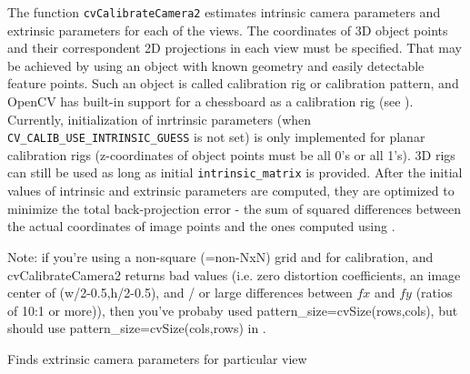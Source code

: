 The function \texttt{cvCalibrateCamera2} estimates intrinsic camera
parameters and extrinsic parameters for each of the views. The
coordinates of 3D object points and their correspondent 2D projections
in each view must be specified. That may be achieved by using an
object with known geometry and easily detectable feature points.
Such an object is called calibration rig or calibration pattern,
and OpenCV has built-in support for a chessboard as a calibration
rig (see ). Currently, initialization
of inrtrinsic parameters (when \texttt{CV\_CALIB\_USE\_INTRINSIC\_GUESS}
is not set) is only implemented for planar calibration rigs
(z-coordinates of object points must be all 0's or all 1's). 3D
rigs can still be used as long as initial \texttt{intrinsic\_matrix}
is provided. After the initial values of intrinsic and extrinsic
parameters are computed, they are optimized to minimize the total
back-projection error - the sum of squared differences between the
actual coordinates of image points and the ones computed using
.

Note: if you're using a non-square (=non-NxN) grid and
 for calibration, and cvCalibrateCamera2 returns
bad values (i.e. zero distortion coefficients, an image center of
(w/2-0.5,h/2-0.5), and / or large differences between $fx$ and $fy$ (ratios of
10:1 or more)), then you've probaby  used pattern\_size=cvSize(rows,cols),
but should use pattern\_size=cvSize(cols,rows) in .

\label{FindExtrinsicCameraParams2}

Finds extrinsic camera parameters for particular view


\begin{description}
\end{description}

